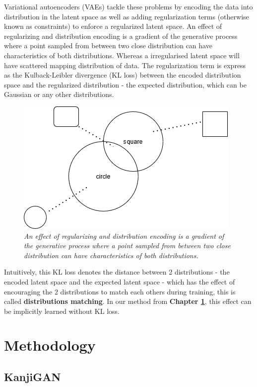 \documentclass[12pt]{report}
\begin{document}
Variational autoencoders (VAEs) tackle these problems by encoding the data into distribution in the latent space as well as adding regularization terms (otherwise known as constraints) to enforce a regularized latent space. An effect of regularizing and distribution encoding is a gradient of the generative process where a point sampled from between two close distribution can have characteristics of both distributions. Whereas a irregularised latent space will have scattered mapping distribution of data. The regularization term is express as the Kulback-Leibler divergence (KL loss) \cite{kl-divergence} between the encoded distribution space and the regularized distribution - the expected distribution, which can be Gaussian or any other distributions. 

\begin{figure}[h]
	\centering
	\includegraphics[scale=0.9]{distribution-space}
	\caption{\textit{An effect of regularizing and distribution encoding is a gradient of the generative process where a point sampled from between two close distribution can have characteristics of both distributions.}}
	\label{fig:distribution-space}
\end{figure}

Intuitively, this KL loss denotes the distance between 2 distributions - the encoded latent space and the expected latent space - which has the effect of encouraging the 2 distributions to match each others during training, this is called \textbf{distributions matching}. In our method from \textbf{Chapter \ref{chap:methodology}}, this effect can be implicitly learned without KL loss.

\chapter{Methodology}
\label{chap:methodology}

\section{KanjiGAN}
\end{document}
